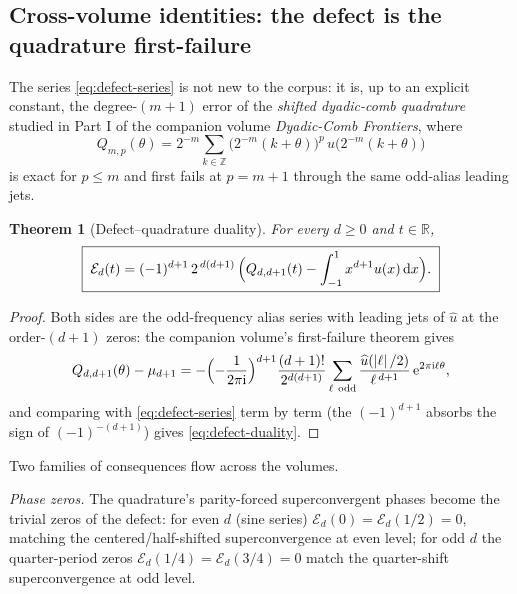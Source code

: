 \documentclass[11pt,oneside]{article}
\numberwithin{equation}{section}
\newtheorem{theorem}{Theorem}[section]
\theoremstyle{definition}
\theoremstyle{remark}
\newcommand{\R}{\mathbb R}
\newcommand{\Z}{\mathbb Z}
\newcommand{\dd}{\,\mathrm d}
\newcommand{\e}{\mathrm e}
\newcommand{\ii}{\mathrm i}
\newcommand{\abs}[1]{\left\lvert #1\right\rvert}
\begin{document}
\subsection{Cross-volume identities: the defect is the quadrature
first-failure}
\label{sec:defect-crosswalk}

The series \eqref{eq:defect-series} is not new to the corpus: it is,
up to an explicit constant, the degree-$(m{+}1)$ error of the
\emph{shifted dyadic-comb quadrature} studied in Part I of the
companion volume \emph{Dyadic-Comb Frontiers}, where
\[
 Q_{m,p}(\theta)
 =2^{-m}\sum_{k\in\Z}
 \bigl(2^{-m}(k+\theta)\bigr)^{p}\,
 u\bigl(2^{-m}(k+\theta)\bigr)
\]
is exact for $p\le m$ and first fails at $p=m+1$ through the same
odd-alias leading jets.

\begin{theorem}[Defect--quadrature duality]
\label{thm:defect-duality}
For every $d\ge0$ and $t\in\R$,
\begin{equation}
 \boxed{\;
 \mathcal E_d(t)
 =(-1)^{d+1}\,2^{\,d(d+1)}\,
 \Bigl(Q_{d,d+1}(t)-\int_{-1}^{1}x^{d+1}u(x)\dd x\Bigr).
 \;}
 \label{eq:defect-duality}
\end{equation}
\end{theorem}

\begin{proof}
Both sides are the odd-frequency alias series with leading jets of
$\widehat u$ at the order-$(d{+}1)$ zeros: the companion volume's
first-failure theorem gives
\[
 Q_{d,d+1}(\theta)-\mu_{d+1}
 =-\Bigl(-\frac1{2\pi\ii}\Bigr)^{d+1}
 \frac{(d+1)!}{2^{d(d+1)}}
 \sum_{\ell\ \mathrm{odd}}
 \frac{\widehat u(\abs\ell/2)}{\ell^{\,d+1}}\,
 \e^{2\pi\ii\ell\theta},
\]
and comparing with \eqref{eq:defect-series} term by term (the
$(-1)^{d+1}$ absorbs the sign of $(-1)^{-(d+1)}$) gives
\eqref{eq:defect-duality}.
\end{proof}

Two families of consequences flow across the volumes.

\emph{Phase zeros.}  The quadrature's parity-forced superconvergent
phases become the trivial zeros of the defect: for even $d$
(sine series) $\mathcal E_d(0)=\mathcal E_d(1/2)=0$, matching the
centered/half-shifted superconvergence at even level; for odd $d$ the
quarter-period zeros $\mathcal E_d(1/4)=\mathcal E_d(3/4)=0$ match
the quarter-shift superconvergence at odd level.
\end{document}
